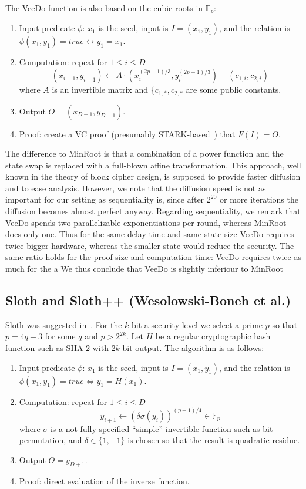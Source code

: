 \documentclass{article}
\begin{document}
The VeeDo function is also based on the cubic roots in $\mathbb{F}_p$:
\begin{enumerate}
    \item Input predicate $\phi$: $x_1$ is the seed, input is $I=(x_1,y_1)$, and the relation is $\phi(x_1,y_1)=true\leftrightarrow y_1=x_1$.
    \item Computation: repeat for $1\leq i\leq D$
    $$
    (x_{i+1},y_{i+1}) \leftarrow A \cdot (x_i^{(2p-1)/3},y_i^{(2p-1)/3})+(c_{1,i},c_{2,i})
    $$
    where $A$ is an invertible matrix and $\{c_{1,*},c_{2,*}$ are some public constants.
     \item Output $O = (x_{D+1},y_{D+1})$.
    \item Proof: create a VC proof (presumably STARK-based~\cite{DBLP:conf/crypto/Ben-SassonBHR19}) that  $F(I) = O$.
\end{enumerate}
The difference to MinRoot is that a combination of a power function and the state swap is replaced with a full-blown affine transformation. This approach, well known in the theory of block cipher design, is supposed to  provide faster diffusion and to ease analysis. However, we note that the diffusion speed is not as important for our setting as sequentiality is, since after $2^{20}$ or more iterations the diffusion becomes almost perfect anyway. Regarding sequentiality, we remark that VeeDo spends two parallelizable exponentiations per round, whereas MinRoot does only one.  Thus for the same delay time and same state size VeeDo requires twice bigger hardware, whereas the smaller state would reduce the security. The same ratio holds for the proof size and computation time: VeeDo requires twice as much for the a We thus conclude that VeeDo is slightly inferiour to MinRoot

\subsection{Sloth and Sloth++ (Wesolowski-Boneh et al.)}
Sloth was suggested in~\cite{DBLP:journals/ijact/LenstraW17}. For the  $k$-bit a security level we select  a prime $p$ so that $p=4q+3$ for some $q$ and $p>2^{2k}$. Let $H$ be a regular cryptographic hash function such as SHA-2 with $2k$-bit output. The algorithm is as follows:
\begin{enumerate}
    \item Input predicate $\phi$: $x_1$ is the seed, input is $I=(x_1,y_1)$, and the relation is $\phi(x_1,y_1)=true\Leftrightarrow y_1=H(x_1)$.
    \item Computation: repeat for $1\leq i\leq D$
    $$
    y_{i+1} \leftarrow (\delta\sigma(y_i))^{(p+1)/4}\in\mathbb{F}_p
    $$
    where  $\sigma $ is a not fully specified ``simple'' invertible function such as bit permutation, and $\delta\in\{1,-1\}$ is chosen so that the result is quadratic residue.
 \item Output $O = y_{D+1}$. %
    \item Proof: direct evaluation of the inverse function.
\end{enumerate}
\end{document}
